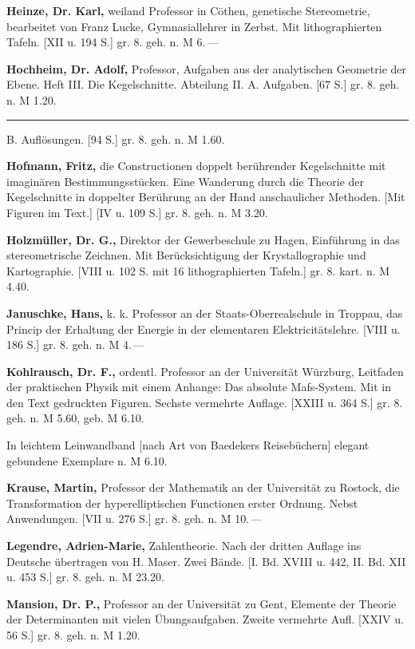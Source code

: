 \documentclass[11pt]{article}
\begin{document}
\textbf{Heinze, Dr. Karl,} weiland Professor in Cöthen, genetische Stereometrie,
bearbeitet von Franz Lucke, Gymnasiallehrer in Zerbst. Mit lithographierten Tafeln.
[XII u. 194 S.] gr. 8. geh. n. M 6.\,---

\textbf{Hochheim, Dr. Adolf,} Professor, Aufgaben aus der analytischen Geometrie der
Ebene. Heft III. Die Kegelschnitte. Abteilung II. A. Aufgaben. [67 S.] gr. 8. geh.
n. M 1.20.

\rule{1.5em}{0.4pt} B. Auflösungen. [94 S.] gr. 8. geh. n. M 1.60.

\textbf{Hofmann, Fritz,} die Constructionen doppelt berührender Kegelschnitte mit
imaginären Bestimmungsstücken. Eine Wanderung durch die Theorie der Kegelschnitte in
doppelter Berührung an der Hand anschaulicher Methoden. [Mit Figuren im Text.]
[IV u. 109 S.] gr. 8. geh. n. M 3.20.

\textbf{Holzmüller, Dr. G.,} Direktor der Gewerbeschule zu Hagen, Einführung in das
stereometrische Zeichnen. Mit Berücksichtigung der Krystallographie und Kartographie.
[VIII u. 102 S. mit 16 lithographierten Tafeln.] gr. 8. kart. n. M 4.40.

\textbf{Januschke, Hans,} k. k. Professor an der Staats-Oberrealschule in Troppau,
das Princip der Erhaltung der Energie in der elementaren Elektricitätslehre.
[VIII u. 186 S.] gr. 8. geh. n. M 4.\,---

\textbf{Kohlrausch, Dr. F.,} ordentl. Professor an der Universität Würzburg, Leitfaden
der praktischen Physik mit einem Anhange: Das absolute Mafs-System. Mit in den Text
gedruckten Figuren. Sechste vermehrte Auflage. [XXIII u. 364 S.] gr. 8. geh. n. M
5.60, geb. M 6.10.

In leichtem Leinwandband [nach Art von Baedekers Reisebüchern] elegant gebundene
Exemplare n. M 6.10.

\textbf{Krause, Martin,} Professor der Mathematik an der Universität zu Rostock, die
Transformation der hyperelliptischen Functionen erster Ordnung. Nebst Anwendungen.
[VII u. 276 S.] gr. 8. geh. n. M 10.\,---

\textbf{Legendre, Adrien-Marie,} Zahlentheorie. Nach der dritten Auflage ins Deutsche
übertragen von H. Maser. Zwei Bände. [I. Bd. XVIII u. 442, II. Bd. XII u. 453 S.]
gr. 8. geh. n. M 23.20.

\textbf{Mansion, Dr. P.,} Professor an der Universität zu Gent, Elemente der Theorie
der Determinanten mit vielen Übungsaufgaben. Zweite vermehrte Aufl. [XXIV u. 56 S.]
gr. 8. geh. n. M 1.20.
\end{document}
